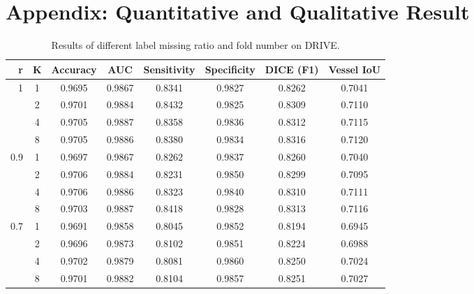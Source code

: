 \documentclass[runningheads]{llncs}
\begin{document}
\section{Appendix: Quantitative and Qualitative Result}
\begin{table}[h]\setlength{\tabcolsep}{6pt}
\setlength{\abovecaptionskip}{0pt}
\centering
\footnotesize
\caption{Results of different label missing ratio  and fold number  on DRIVE. }
\begin{tabular}{|r|c|c|c|c|c|c|c|}
\hline
r& K & Accuracy & AUC & Sensitivity & Specificity &   DICE (F1) &Vessel IoU  \\ \hline\hline

1 &1&0.9695&0.9867&0.8341&0.9827&0.8262&0.7041\\ \hline
&2&0.9701&0.9884&0.8432&0.9825&0.8309&0.7110\\ \hline
&4&0.9705&0.9887&0.8358&0.9836&0.8312&0.7115\\ \hline
&8&0.9705&0.9886&0.8380&0.9834&0.8316&0.7120\\ \hline\hline
0.9&1&0.9697&0.9867&0.8262&0.9837&0.8260&0.7040\\ \hline
&2&0.9706&0.9884&0.8231&0.9850&0.8299&0.7095\\ \hline
&4&0.9706&0.9886&0.8323&0.9840&0.8310&0.7111\\ \hline
&8&0.9703&0.9887&0.8418&0.9828&0.8313&0.7116\\ \hline\hline
0.7&1&0.9691&0.9858&0.8045&0.9852&0.8194&0.6945\\ \hline
&2&0.9696&0.9873&0.8102&0.9851&0.8224&0.6988\\ \hline
&4&0.9702&0.9879&0.8081&0.9860&0.8250&0.7024\\ \hline
&8&0.9701&0.9882&0.8104&0.9857&0.8251&0.7027\\ \hline
\end{tabular}\label{exp:drive_full}
\end{table}
\end{document}
